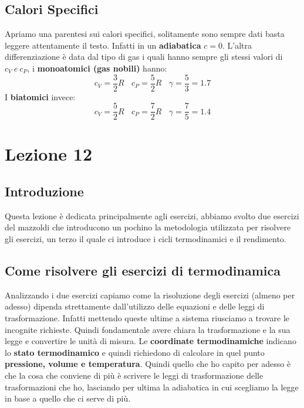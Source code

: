 \documentclass{article}
\numberwithin{equation}{subsection}
\begin{document}
\subsection{Calori Specifici}
Apriamo una parentesi sui calori specifici, solitamente sono sempre dati basta leggere attentamente il testo. Infatti in un \textbf{adiabatica} $c=0$. L'altra differenziazione è data dal tipo di gas i quali hanno sempre gli stessi valori di $c_V \ e \ c_P$, i \textbf{monoatomici (gas nobili)} hanno: 
\begin{equation}
    c_V= \frac{3}{2}R \ \ \ \ c_P=\frac{5}{2}R \ \ \ \ \gamma=\frac{5}{3}=1.7 
\end{equation}
I \textbf{biatomici} invece:
\begin{equation}
    c_V= \frac{5}{2}R \ \ \ \ c_P=\frac{7}{2}R \ \ \ \ \gamma=\frac{7}{5}=1.4 
\end{equation}
\section{Lezione 12}
\subsection{Introduzione}
Questa lezione è dedicata principalmente agli esercizi, abbiamo svolto due esercizi del mazzoldi che introducono un pochino la metodologia utilizzata per risolvere gli esercizi, un terzo il quale ci introduce i cicli termodinamici e il rendimento.
\subsection{Come risolvere gli esercizi di termodinamica}
Analizzando i due esercizi capiamo come la risoluzione degli esercizi (almeno per adesso) dipenda strettamente dall'utilizzo delle equazioni e delle leggi di trasformazione. Infatti mettendo queste ultime a sistema riusciamo a trovare le incognite richieste. Quindi fondamentale avere chiara la trasformazione e la sua legge e convertire le unità di misura. Le \textbf{coordinate termodinamiche} indicano lo \textbf{stato termodinamico} e quindi richiedono di calcolare in quel punto \textbf{pressione, volume e temperatura}. Quindi quello che ho capito per adesso è che la cosa che conviene di più è scrivere le leggi di trasformazione delle trasformazioni che ho, lasciando per ultima la adiabatica in cui scegliamo la legge in base a quello che ci serve di più.
\end{document}
